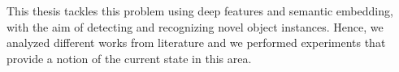 \documentclass[12pt,twosided]{book}
\begin{document}
This thesis tackles this problem using deep features and semantic embedding, with the aim of detecting and recognizing novel object instances. Hence, we analyzed different works from literature and we performed experiments that provide a notion of the current state in this area.

\begingroup
\hypersetup{hidelinks}
\tableofcontents
\endgroup

\mainmatter %
\pagestyle{headings}












\thispagestyle{empty}

\backmatter
\nocite{*}

\end{document}
